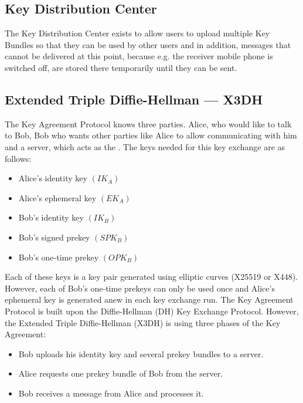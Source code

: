 \documentclass[12pt,oneside,a4paper,parskip]{scrbook}
\begin{document}

\subsection*{Key Distribution Center}
\label{subsec:KDC}

The Key Distribution Center exists to allow users to upload multiple Key Bundles so that they can be used by other users and in addition, messages that cannot be delivered at this point, because e.g. the receiver mobile phone is switched off, are stored there temporarily until they can be sent.

\subsection{Extended Triple Diffie-Hellman --- X3DH}
\label{subsec:x3dh}

The Key Agreement Protocol knows three parties. Alice, who would like to talk to Bob, Bob who wants other parties like Alice to allow communicating with him and a server, which acts as the . The keys needed for this key exchange are as follows:
\begin{itemize}
  \item Alice's identity key $   (IK_{A})  $
  \item Alice's ephemeral key $   ({EK_{A}})  $
  \item Bob's identity key $   ({IK_{B}})  $ 
  \item Bob's signed prekey $   ({SPK_{B}})  $ 
  \item Bob's one-time prekey $   ({OPK_{B}})  $
\end{itemize}

Each of these keys is a key pair generated using elliptic curves (X25519 or X448). However, each of Bob's one-time prekeys can only be used once and Alice's ephemeral key is generated anew in each key exchange run.
The Key Agreement Protocol is built upon the Diffie-Hellman (DH) Key Exchange Protocol. However, the Extended Triple Diffie-Hellman (X3DH) is using three phases of the Key Agreement:
\begin{itemize}
  \item Bob uploads his identity key and several prekey bundles to a server.
  \item Alice requests one prekey bundle of Bob from the server.
  \item Bob receives a message from Alice and processes it.
\end{itemize}
\end{document}
